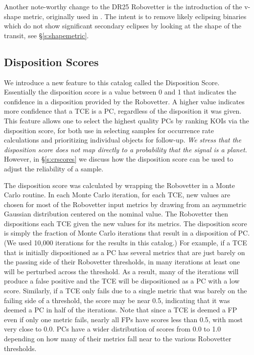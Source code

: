 Another note-worthy change to the DR25 Robovetter is the introduction of the v-shape metric, originally used in \citet{Batalha2013}.  The intent is to remove likely eclipsing binaries which do not show significant secondary eclipses by looking at the shape of the transit, see \S\ref{s:shapemetric}.



\subsection{Disposition Scores}
\label{s:scores}
We introduce a new feature to this catalog called the Disposition Score. Essentially the disposition score is a value between 0 and 1 that indicates the confidence in a disposition provided by the Robovetter. A higher value indicates more confidence that a TCE is a PC, regardless of the disposition it was given. This feature allows one to select the highest quality PCs by ranking KOIs via the disposition score, for both use in selecting samples for occurrence rate calculations and prioritizing individual objects for follow-up. \emph{We stress that the disposition score does not map directly to a probability that the signal is a planet.} However, in \S\ref{s:crscores} we discuss how the disposition score can be used to adjust the reliability of a sample.

The disposition score was calculated by wrapping the Robovetter in a Monte Carlo routine. In each Monte Carlo iteration, for each TCE, new values are chosen for most of the Robovetter input metrics by drawing from an asymmetric Gaussian distribution centered on the nominal value. The Robovetter then dispositions each TCE given the new values for its metrics. The disposition score is simply the fraction of Monte Carlo iterations that result in a disposition of PC. (We used 10,000 iterations for the results in this catalog.) For example, if a TCE that is initially dispositioned as a PC has several metrics that are just barely on the passing side of their Robovetter thresholds, in many iterations at least one will be perturbed across the threshold. As a result, many of the iterations will produce a false positive and the TCE will be dispositioned as a PC with a low score.  Similarly, if a TCE only fails due to a single metric that was barely on the failing side of a threshold, the score may be near 0.5, indicating that it was deemed a PC in half of the iterations. Note that since a TCE is deemed a FP even if only one metric fails, nearly all FPs have scores less than 0.5, with most very close to 0.0.  PCs have a wider distribution of scores from 0.0 to 1.0 depending on how many of their metrics fall near to the various Robovetter thresholds.

